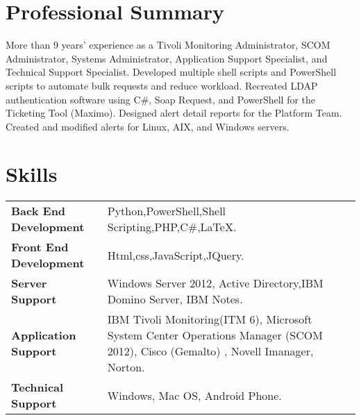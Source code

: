 \documentclass[letterpaper, 12pt]{article}
\begin{document}
\begin{minipage}{0.45\textwidth}
	\section*{Professional Summary} 
	
	More than 9 years' experience as a Tivoli Monitoring Administrator, SCOM Administrator, Systems Administrator, Application Support Specialist, and Technical Support Specialist. Developed multiple shell scripts and PowerShell scripts to automate bulk requests and reduce workload. Recreated LDAP authentication software using C\#, Soap Request, and PowerShell for the Ticketing Tool (Maximo). Designed alert detail reports for the Platform Team. Created and modified alerts for Linux, AIX, and Windows servers. 
		
\end{minipage}
\hfil
\begin{minipage}{0.5\textwidth}
	
	\section*{Skills}
	\begin{tabular}{m{} m{}} 
		\textbf{Back End Development} & Python,PowerShell,Shell Scripting,PHP,C\#,\LaTeX.  \\ 
		\textbf{Front End Development} & Html,css,JavaScript,JQuery. \\
		\textbf{Server Support} & Windows Server 2012, Active Directory,IBM Domino Server, IBM Notes. \\
		\textbf{Application Support} & IBM Tivoli Monitoring(ITM 6), Microsoft System Center Operations Manager (SCOM 2012), Cisco (Gemalto) , Novell Imanager, Norton. \\ 
		\textbf{Technical Support} & Windows, Mac OS, Android Phone. \\ 
		
	\end{tabular}
\end{minipage}
	

\vspace*{1cm}
\blindtext	
\end{document}
